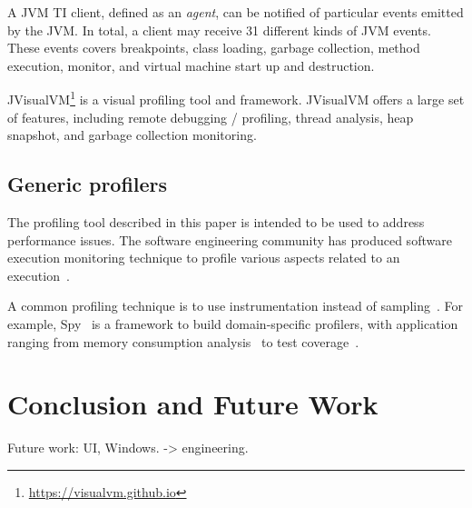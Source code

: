 \documentclass[10pt,preprint,nonatbib]{sigplanconf}
\newcommand{\seclabel}[1]{\label{sec:#1}}
\newcommand{\myparagraph}[1]{\vspace{0.1cm}\noindent \textbf{\textit{#1.}}}
\begin{document}
A JVM TI client, defined as an \emph{agent}, can be notified of particular events emitted by the JVM. In total, a client may receive 31 different kinds of JVM events. These events covers breakpoints, class loading, garbage collection, method execution, monitor, and virtual machine start up and destruction.

JVisualVM\footnote{\url{https://visualvm.github.io}} is a visual profiling tool and framework. JVisualVM offers a large set of features, including remote debugging / profiling, thread analysis, heap snapshot, and garbage collection monitoring. 

\subsection{Generic profilers}

The profiling tool described in this paper is intended to be used to address performance issues. The software engineering community has produced software execution monitoring technique to profile various aspects related to an execution~\cite{Ress12a,Ress12b}. 

A common profiling technique is to use instrumentation instead of sampling~\cite{Metz05a}. For example, Spy~\cite{Berg11h} is a framework to build domain-specific profilers, with application ranging from memory consumption analysis~\cite{Infa15a} to test coverage~\cite{Berg12c}.

%
%
%
%

\section{Conclusion and Future Work}\seclabel{conclusion}

Future work: UI, Windows. -> engineering.





%


\end{document}
